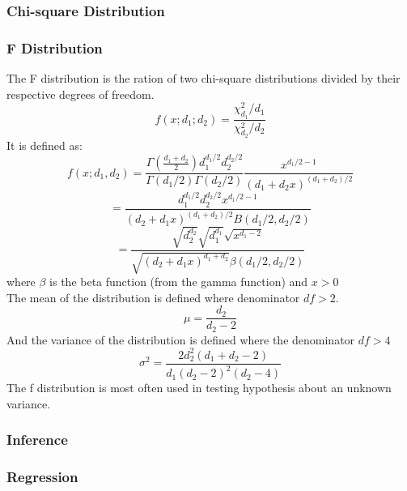 \documentclass[a4paper]{article}
\begin{document}
\subsubsection*{Chi-square Distribution}

\subsubsection*{F Distribution}

The F distribution is the ration of two chi-square distributions divided by their respective degrees of freedom.
$$
f(x; d_1; d_2) = \frac{\chi_{d_1}^2/d_1}{\chi_{d_2}^2/d_2}
$$
It is defined as:
$$
f(x; d_1, d_2) = \frac{ \Gamma\left( \frac{ d_1 + d_2 }{2} \right) d_1^{d_1/2} d_2^{d_2/2} } {\Gamma(d_1/2)\Gamma(d_2/2) } \frac{x^{d_1/2 - 1}}{(d_1 + d_2x)^{(d_1 + d_2)/2}}
$$
$$
= \frac{ d_1^{d_1/2} d_2^{d_2/2}x^{d_1/2 - 1} } { (d_2 + d_1x)^{(d_1+d_2)/2} B(d_1/2, d_2/2)}
$$
$$
= \frac{ \sqrt{d_2^{d_2}}  \sqrt{ d_1^{d_1}  } \sqrt{ x^{d_1-2} }  }{\sqrt{ (d_2+d_1x)^{d_1 + d_2} } \beta(d_1/2, d_2/2) }
$$
where $\beta$ is the beta function (from the gamma function) and $x > 0$\\
The mean of the distribution is defined where denominator $df > 2$.
$$
\mu = \frac{ d_2 }{d_2 - 2}
$$
And the variance of the distribution is defined where the denominator $df > 4$
$$
\sigma^2 = \frac{ 2 d_2^2 (d_1 + d_2 - 2) }{ d_1 (d_2 - 2)^2 (d_2 - 4) }
$$
The f distribution is most often used in testing hypothesis about an unknown variance.


\subsubsection{Inference}

\subsubsection{Regression}
\end{document}
